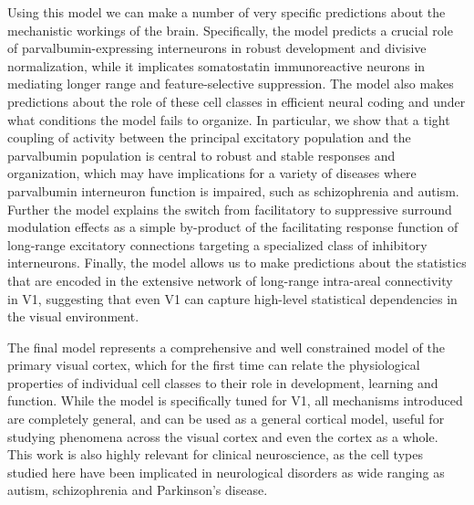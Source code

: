 Using this model we can make a number of very specific predictions
about the mechanistic workings of the brain. Specifically, the model
predicts a crucial role of parvalbumin-expressing interneurons in
robust development and divisive normalization, while it implicates
somatostatin immunoreactive neurons in mediating longer range and
feature-selective suppression. The model also makes predictions about
the role of these cell classes in efficient neural coding and under
what conditions the model fails to organize. In particular, we show
that a tight coupling of activity between the principal excitatory
population and the parvalbumin population is central to robust and
stable responses and organization, which may have implications for a
variety of diseases where parvalbumin interneuron function is
impaired, such as schizophrenia and autism. Further the model explains
the switch from facilitatory to suppressive surround modulation
effects as a simple by-product of the facilitating response function
of long-range excitatory connections targeting a specialized class of
inhibitory interneurons. Finally, the model allows us to make
predictions about the statistics that are encoded in the extensive
network of long-range intra-areal connectivity in V1, suggesting that
even V1 can capture high-level statistical dependencies in the visual
environment.

The final model represents a comprehensive and well constrained model
of the primary visual cortex, which for the first time can relate the
physiological properties of individual cell classes to their role in
development, learning and function. While the model is specifically
tuned for V1, all mechanisms introduced are completely general, and
can be used as a general cortical model, useful for studying phenomena
across the visual cortex and even the cortex as a whole. This work is also
highly relevant for clinical neuroscience, as the cell types studied
here have been implicated in neurological disorders as wide ranging as
autism, schizophrenia and Parkinson's disease.
\endgroup

